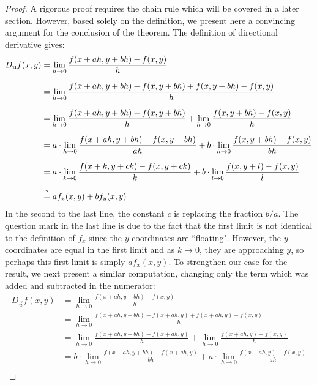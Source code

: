 \documentclass[handout]{ximera}
\begin{document}
\begin{proof}
A rigorous proof requires the chain rule which will be covered in a later section. 
However, based solely on the definition, we present here a convincing 
argument for the conclusion of the theorem. 
The definition of directional derivative gives:
\begin{align*}
D_{\vec u} f(x,y) &= \lim_{h \to 0} \frac{f(x + ah, y + bh) -f(x,y)}{h} \\[6pt]
                  &= \lim_{h \to 0} \frac{f(x + ah, y + bh) - f(x , y+ bh) + 
                  f(x, y+bh) -f(x,y)}{h} \\[6pt]
                  &= \lim_{h \to 0} \frac{f(x + ah, y + bh) - f(x , y+ bh)}{h} + 
                  \lim_{h \to 0} \frac{f(x , y+ bh) -f(x,y)}{h} \\[6pt]
                  &= a\cdot \lim_{h \to 0} \frac{f(x + ah, y + bh) - f(x , y+ bh)}{ah} + 
                  b\cdot \lim_{h \to 0} \frac{f(x , y+ bh) -f(x,y)}{bh} \\[6pt]
                  &= a\cdot \lim_{k \to 0} \frac{f(x + k, y + ck) - f(x , y+ ck)}{k} + 
                  b\cdot \lim_{l \to 0} \frac{f(x , y+ l) -f(x,y)}{l} \\[6pt]
                  &\overset{\scriptsize\text{?}}{=}  a f_x(x,y) + bf_y(x,y)
\end{align*}
In the second to the last line, the constant $c$ is replacing the fraction $b/a$.  
The question mark in the last line is due to the fact that the first limit is not
identical to the definition of $f_x$ since the $y$ coordinates are ``floating".  
However, the $y$ coordinates are equal in the first limit and as $k \to 0$, 
they are approaching $y$, 
so perhaps this first limit is simply $af_x(x,y)$. 
To strengthen our case for the result, we next present a similar computation, 
changing only the term which was added and subtracted in the numerator:
\begin{align*}
D_{\vec u} f(x,y) &= \lim_{h \to 0} \frac{f(x + ah, y + bh) -f(x,y)}{h} \\[6pt]
                  &= \lim_{h \to 0} \frac{f(x + ah, y + bh) - f(x+ah , y) + 
                  f(x+ah, y) -f(x,y)}{h} \\[6pt]
                  &= \lim_{h \to 0} \frac{f(x + ah, y + bh) - f(x+ah, y)}{h} + 
                  \lim_{h \to 0} \frac{f(x+ah , y) -f(x,y)}{h} \\[6pt]
                  &= b\cdot \lim_{h \to 0} \frac{f(x + ah, y + bh) - f(x+ah , y)}{bh} + 
                  a\cdot \lim_{h \to 0} \frac{f(x+ah , y) -f(x,y)}{ah} \\[6pt]

\end{align*}
\end{proof}
\end{document}
